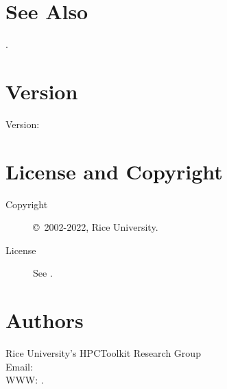 \documentclass[english]{article}
\begin{document}
\section{See Also}

.

\section{Version}

Version: \Version

\section{License and Copyright}

\begin{description}
\item[Copyright] \copyright\ 2002-2022, Rice University.
\item[License] See .
\end{description}

\section{Authors}

\noindent
Rice University's HPCToolkit Research Group \\
Email:  \\
WWW: .

\LatexManEnd
\end{document}
